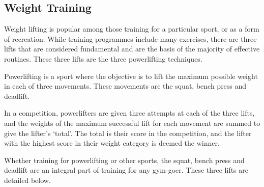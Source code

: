 \subsection{Weight Training}

Weight lifting is popular among those training for a particular sport, or as a form of recreation. While training programmes include many exercises, there are three lifts that are considered fundamental and are the basis of the majority of effective routines. These three lifts are the three powerlifting techniques.

Powerlifting is a sport where the objective is to lift the maximum possible weight in each of three movements. These movements are the squat, bench press and deadlift.

In a competition, powerlifters are given three attempts at each of the three lifts, and the weights of the maximum successful lift for each movement are summed to give the lifter's `total'. The total is their score in the competition, and the lifter with the highest score in their weight category is deemed the winner.

Whether training for powerlifting or other sports, the squat, bench press and deadlift are an integral part of training for any gym-goer. These three lifts are detailed below.
\pagebreak

\pagebreak

\pagebreak


